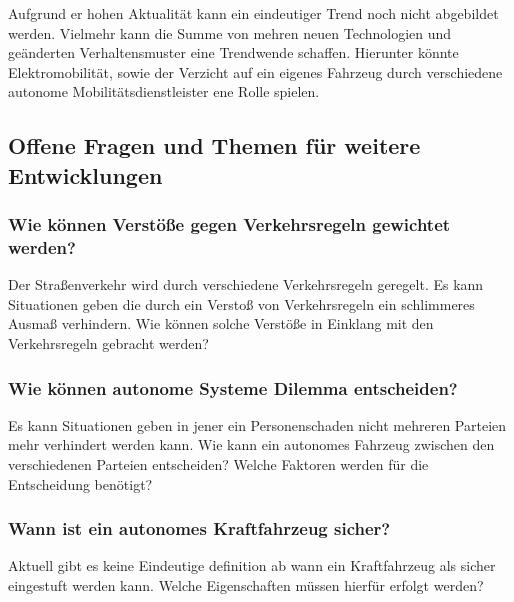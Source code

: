 Aufgrund er hohen Aktualität kann ein eindeutiger Trend noch nicht abgebildet werden.
Vielmehr kann die Summe von mehren neuen Technologien und geänderten Verhaltensmuster eine Trendwende schaffen.
Hierunter könnte Elektromobilität, sowie der Verzicht auf ein eigenes Fahrzeug durch verschiedene
autonome Mobilitätsdienstleister ene Rolle spielen.

\subsection{Offene Fragen und Themen für weitere Entwicklungen}
\subsubsection{Wie können Verstöße gegen Verkehrsregeln gewichtet werden?}

Der Straßenverkehr wird durch verschiedene Verkehrsregeln geregelt.
Es kann Situationen geben die durch ein Verstoß von Verkehrsregeln ein
schlimmeres Ausmaß verhindern.
Wie können solche Verstöße in Einklang mit den Verkehrsregeln gebracht werden?

\subsubsection{Wie können autonome Systeme Dilemma entscheiden?}
Es kann Situationen geben in jener ein Personenschaden nicht mehreren Parteien mehr verhindert werden kann.
Wie kann ein autonomes Fahrzeug zwischen den verschiedenen Parteien entscheiden?
Welche Faktoren werden für die Entscheidung benötigt?

\subsubsection{Wann ist ein autonomes Kraftfahrzeug sicher?}
Aktuell gibt es keine Eindeutige definition ab wann ein Kraftfahrzeug als sicher eingestuft werden kann.
Welche Eigenschaften müssen hierfür erfolgt werden?